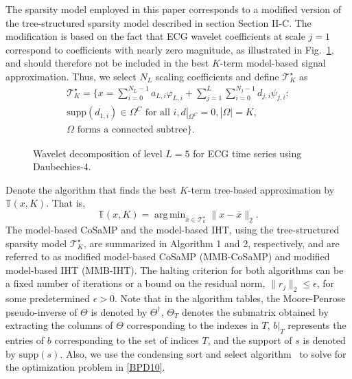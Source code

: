 \documentclass[journal]{IEEEtran}
\DeclareMathOperator*{\argmin}{arg\,min}
\begin{document}
The sparsity model employed in this paper corresponds to a modified version of the tree-structured sparsity model described in section Section II-C. The modification is based on the fact that ECG wavelet coefficients at scale $j=1$ correspond to coefficients with nearly zero magnitude, as illustrated in Fig.~\ref{fig:4}, and should  therefore not be included in the best $K$-term model-based signal approximation. Thus, we select $N_L$ scaling coefficients and define $\mathcal{T}_K^\star$ as
\begin{multline}
    \mathcal{T}_K^\star=\bigg\{x=\displaystyle\sum\limits_{i=0}^{N_L-1} a_{L,i}\varphi_{L,i}+\displaystyle\sum\limits_{j=1}^{L}\displaystyle\sum\limits_{i=0}^{N_j-1}d_{j,i}\psi_{j,i}: \\ \text{supp}(d_{1,i})\in\Omega^C \text{ for all } i, d|_{\Omega^C}=0, |\Omega|=K,\\ \Omega \mbox{ forms a connected subtree} \bigg\}.
\end{multline}

\begin{figure}[t]
\caption{Wavelet decomposition of level $L=5$ for ECG time series using Daubechies-4.} \label{fig:4}
\end{figure}
Denote the algorithm that finds the best $K$-term tree-based approximation by $\mathbb{T}(x,K)$. That is,
\begin{equation}\label{BPD10}
\mathbb{T}(x,K)=\argmin_{\bar{x}\in \mathcal{T}_k^\star} \|x-\bar{x}\|_2.
\end{equation}
The model-based CoSaMP and the model-based IHT, using the tree-structured sparsity model $ \mathcal{T}_K^\star$, are summarized in Algorithm 1 and 2, respectively, and are referred to as modified model-based CoSaMP (MMB-CoSaMP) and modified model-based IHT (MMB-IHT). The halting criterion for both algorithms can be a fixed number of iterations or a bound on the residual norm, $\|r_j\|_2\leq \epsilon$, for some predetermined $\epsilon>0$. Note that in the algorithm tables, the Moore-Penrose pseudo-inverse of $\Theta$ is denoted by $\Theta^\dagger$, $\Theta_T$ denotes the submatrix obtained by extracting the columns of $\Theta$ corresponding to the indexes in $T$, $b|_{T}$ represents the entries of $b$ corresponding to the set of indices $T$, and the support of $s$ is denoted by $\text{supp}(s)$. Also, we use the condensing sort and select algorithm~\cite{Bara02} to solve for the optimization problem in \eqref{BPD10}.
\end{document}
